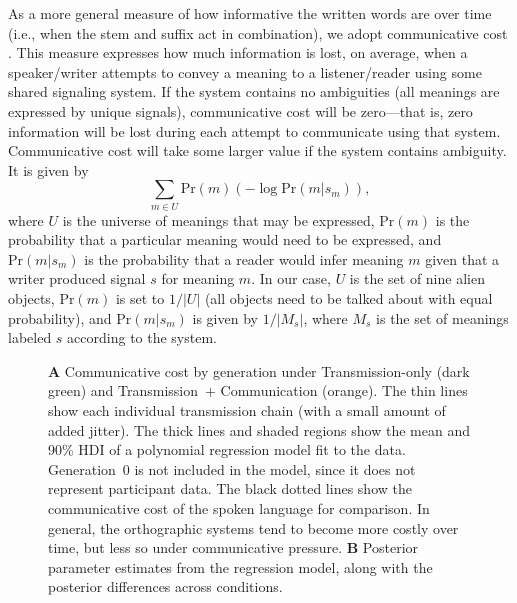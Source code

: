 \documentclass[doc,biblatex]{apa7}
\begin{document}
As a more general measure of how informative the written words are over time (i.e., when the stem and suffix act in combination), we adopt communicative cost \parencite{KempRegier:2012, Kemp:2018, Regier:2015}. This measure expresses how much information is lost, on average, when a speaker/writer attempts to convey a meaning to a listener/reader using some shared signaling system. If the system contains no ambiguities (all meanings are expressed by unique signals), communicative cost will be zero---that is, zero information will be lost during each attempt to communicate using that system. Communicative cost will take some larger value if the system contains ambiguity. It is given by
	\begin{equation}
	\sum_{m \in U} \mathrm{Pr}(m) ( -\log \mathrm{Pr}(m|s_m) ),
	\end{equation}
where $U$ is the universe of meanings that may be expressed, $\mathrm{Pr}(m)$ is the probability that a particular meaning would need to be expressed, and $\mathrm{Pr}(m|s_m)$ is the probability that a reader would infer meaning $m$ given that a writer produced signal $s$ for meaning $m$. In our case, $U$ is the set of nine alien objects, $\mathrm{Pr}(m)$ is set to $1/|U|$ (all objects need to be talked about with equal probability), and $\mathrm{Pr}(m|s_m)$ is given by $1/|M_s|$, where $M_s$ is the set of meanings labeled $s$ according to the system.

	\begin{figure}
	\vspace*{2pt}
	\caption{\textbf{A} Communicative cost by generation under Transmission-only (dark green) and Transmission~+ Communication (orange). The thin lines show each individual transmission chain (with a small amount of added jitter). The thick lines and shaded regions show the mean and 90\% HDI of a polynomial regression model fit to the data. Generation~0 is not included in the model, since it does not represent participant data. The black dotted lines show the communicative cost of the spoken language for comparison. In general, the orthographic systems tend to become more costly over time, but less so under communicative pressure. \textbf{B} Posterior parameter estimates from the regression model, along with the posterior differences across conditions.}
	\label{cost_dif}
	\end{figure}
\end{document}

